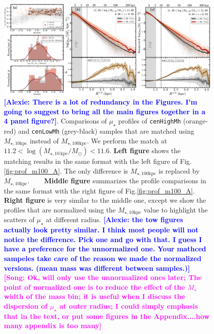 \documentclass{emulateapj}
\def\rbcg{\texttt{cenHighMh}}
\def\nbcg{\texttt{cenLowMh}}
\def\mstar{{$M_{\star}$}}
\def\minn{{$M_{\star,10\mathrm{kpc}}$}}
\def\mtot{{$M_{\star,100\mathrm{kpc}}$}}
\def\mden{{$\mu_{\star}$}}
\newcommand{\song}[1]{\textcolor{magenta}{\textbf{[Song: #1]}}}
\newcommand{\alexie}[1]{\textcolor{blue}{\textbf{[Alexie: #1]}}}
\begin{document}
\begin{CJK*}{UTF8}{gbsn}
  \begin{figure}[t!]
      \centering 
      \includegraphics[width=\textwidth]{fig/redbcg_prof_m10C}
      \caption{\alexie{There is a lot of redundancy in the Figures. I'm going to suggest to bring all the main figures together in a 4 panel figure?}. Comparisons of \mden{} profiles of \rbcg{} (orange-red) and \nbcg{} 
          (grey-black) samples that are matched using \minn{} instead of \mtot{}. 
          We perform the match at $11.2<\log (M_{\star,10\ \mathrm{kpc}}/M_{\odot})<11.6$.
          \textbf{Left figure} shows the matching results in the same format with 
          the left figure of Fig.\ref{fig:prof_m100_A}.  
          The only difference is \mtot{} is replaced by \minn{}. ~~~
          \textbf{Middle figure} summarizes the profile comparisons in the same format 
          with the right figure of Fig.\ref{fig:prof_m100_A}.~~~
          \textbf{Right figure} is very similar to the middle one, except we show the 
          profiles that are normalized using the \minn{} value to highlight the 
          scatters of \mden{} at different radius. 
          \alexie{the tow figures actually look pretty similar. I think most people will not notice the difference. Pick one and go with that. I guess I have a preference for the unnormalized one. Your mathced sampeles take care of the reason we made the normalized versions. (mean mass was different between samples.)}
          \song{Ok, will only use the unnormalized ones later; The point of normalized one is to 
          reduce the effect of the \mstar{} width of the mass bin; it is useful when I 
          discuss the dispersion of \mden{} at outer radius; I could simply emphasis that 
          in the text, or put some figures in the Appendix....how many appendix is too
          many}}
      \label{fig:prof_m10_A}
  \end{figure}


\end{CJK*}
\end{document}
